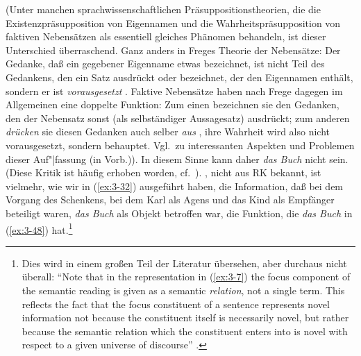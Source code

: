 \documentclass[output=paper]{langsci/langscibook}
\begin{document}
{  (Unter manchen sprachwissenschaftlichen Präsuppositionstheorien, die
  die Existenzpräsupposition von Eigennamen und die Wahrheitspräsupposition von faktiven Nebensätzen als essentiell gleiches Phänomen behandeln, ist dieser Unterschied überraschend. Ganz anders in Freges Theorie der Nebensätze: Der Gedanke, daß ein
  gegebener Eigenname etwas bezeichnet, ist nicht Teil des Gedankens,
  den ein Satz ausdrückt oder bezeichnet, der den Eigennamen enthält,
  sondern er ist \emph{vorausgesetzt} \citep[40]{Frege1892}. Faktive Nebensätze
  haben nach Frege dagegen im Allgemeinen eine doppelte Funktion: Zum einen
  bezeichnen sie den Gedanken, den der Nebensatz sonst (\dash als
  selbständiger Aussagesatz) ausdrückt; zum anderen \emph{drücken} sie diesen
  Gedanken auch selber \emph{aus} \citep[47f]{Frege1892}, ihre Wahrheit wird
  also nicht vorausgesetzt, sondern behauptet. Vgl.\ zu interessanten
  Aspekten und Problemen dieser Auf"|fassung \citeauthor{Hoehle79c} (in Vorb.)).%
}
In diesem Sinne kann daher \textit{das
Buch} nicht  sein. (Diese Kritik ist häufig
erhoben worden, cf.\ \zb \citet{Weiss75}). , \dash nicht aus RK bekannt, ist vielmehr, wie wir in (\ref{ex:3-32}) ausgeführt haben, die Information, daß bei dem Vorgang des Schenkens, bei dem Karl als Agens und das Kind als Empfänger beteiligt waren, \textit{das Buch}
als Objekt betroffen war, \dash die Funktion, die \textit{das Buch} in (\ref{ex:3-48})
hat.\footnote{\label{fn:3-24}%
	Dies wird in einem großen Teil der Literatur übersehen, aber durchaus
  nicht überall: "`Note that in the representation in (\ref{ex:3-7}) the focus
  component of the semantic reading is given as a semantic \textit{relation}, not
  a single term. This reflects the fact that the focus constituent of a
  sentence represents novel information not because the constituent
  itself is necessarily novel, but rather because the semantic
  relation which the constituent enters into is novel with respect to a
  given universe of discourse"' \citep[218]{Akmajian70}.%
}
\end{document}
